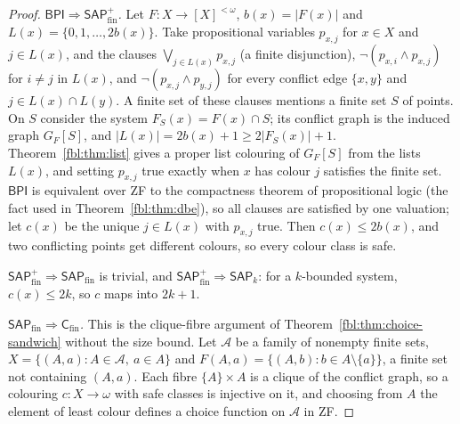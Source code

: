 \documentclass[11pt]{article}
\theoremstyle{definition}
\theoremstyle{remark}
\newcommand{\cA}{\mathcal A}
\newcommand{\BPI}{\mathsf{BPI}}
\newcommand{\SAP}{\mathsf{SAP}}
\newcommand{\Cm}{\mathsf{C}}
\begin{document}
\begin{proof}
\emph{$\BPI\Rightarrow\SAP^{+}_{\mathrm{fin}}$.} Let $F:X\to[X]^{<\omega}$,
$b(x)=\lvert F(x)\rvert$ and $L(x)=\{0,1,\dots,2b(x)\}$. Take propositional
variables $p_{x,j}$ for $x\in X$ and $j\in L(x)$, and the clauses
$\bigvee_{j\in L(x)}p_{x,j}$ (a finite disjunction),
$\neg(p_{x,i}\wedge p_{x,j})$ for $i\ne j$ in $L(x)$, and
$\neg(p_{x,j}\wedge p_{y,j})$ for every conflict edge $\{x,y\}$ and
$j\in L(x)\cap L(y)$. A finite set of these clauses mentions a finite set
$S$ of points. On $S$ consider the system $F_S(x)=F(x)\cap S$; its conflict
graph is the induced graph $G_F[S]$, and $\lvert L(x)\rvert=2b(x)+1\ge
2\lvert F_S(x)\rvert+1$. Theorem~\ref{fbl:thm:list} gives a proper list
colouring of $G_F[S]$ from the lists $L(x)$, and setting $p_{x,j}$ true
exactly when $x$ has colour $j$ satisfies the finite set. $\BPI$ is
equivalent over ZF to the compactness theorem of propositional logic (the
fact used in Theorem~\ref{fbl:thm:dbe}), so all clauses are satisfied by one
valuation; let $c(x)$ be the unique $j\in L(x)$ with $p_{x,j}$ true. Then
$c(x)\le2b(x)$, and two conflicting points get different colours, so every
colour class is safe.

\emph{$\SAP^{+}_{\mathrm{fin}}\Rightarrow\SAP_{\mathrm{fin}}$} is trivial,
and \emph{$\SAP^{+}_{\mathrm{fin}}\Rightarrow\SAP_k$}: for a $k$-bounded
system, $c(x)\le2k$, so $c$ maps into $2k+1$.

\emph{$\SAP_{\mathrm{fin}}\Rightarrow\Cm_{\mathrm{fin}}$.} This is the
clique-fibre argument of Theorem~\ref{fbl:thm:choice-sandwich} without the
size bound. Let $\cA$ be a family of nonempty finite sets, $X=\{(A,a):
A\in\cA,\ a\in A\}$ and $F(A,a)=\{(A,b):b\in A\setminus\{a\}\}$, a finite set
not containing $(A,a)$. Each fibre $\{A\}\times A$ is a clique of the
conflict graph, so a colouring $c:X\to\omega$ with safe classes is
injective on it, and choosing from $A$ the element of least colour defines
a choice function on $\cA$ in ZF.
\end{proof}
\end{document}
